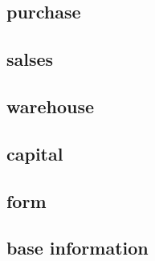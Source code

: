 \subsection*{purchase}

\subsection*{salses}

\subsection*{warehouse}

\subsection*{capital}

\subsection*{form}

\subsection*{base information}